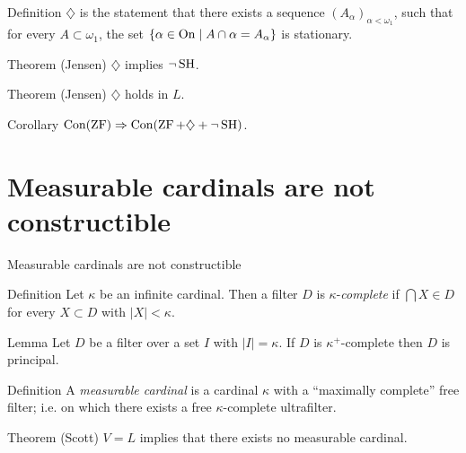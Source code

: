 \begin{frame}
	\begin{block}{Definition}
		$\diamondsuit$ is the statement that there exists a sequence $(A_\alpha)_{\alpha<\omega_1}$, such that for every $A\subset\omega_1$, the set $\{\alpha\in\operatorname{On}\mid A\cap\alpha=A_\alpha\}$ is stationary.
	\end{block}
	
	\pause\begin{block}{Theorem (Jensen)}
		$\diamondsuit$ implies $\lnot\operatorname{SH}$.
	\end{block}
	
	\pause\begin{block}{Theorem (Jensen)}
		$\diamondsuit$ holds in $L$.
	\end{block}
	
	\pause\begin{block}{Corollary}
		$\operatorname{Con}(\operatorname{ZF})\Rightarrow\operatorname{Con}(\operatorname{ZF}+\diamondsuit+\lnot\operatorname{SH})$.
	\end{block}
\end{frame}


\section[No measurables in $L$]{Measurable cardinals are not constructible}
\begin{frame}{Measurable cardinals are not constructible}
	\begin{block}{Definition}
		Let $\kappa$ be an infinite cardinal. Then a filter $D$ is $\kappa$-\textit{complete} if $\bigcap X\in D$ for every $X\subset D$ with $|X|<\kappa$.
	\end{block}
	
	\pause\begin{block}{Lemma}
		Let $D$ be a filter over a set $I$ with $|I|=\kappa$. If $D$ is $\kappa^+$-complete then $D$ is principal.
	\end{block}
	
	\pause\begin{block}{Definition}
		A \textit{measurable cardinal} is a cardinal $\kappa$ with a ``maximally complete'' free filter; i.e. on which there exists a free $\kappa$-complete ultrafilter.
	\end{block}
	
	\pause\begin{block}{Theorem (Scott)}
		$V{=}L$ implies that there exists no measurable cardinal.
	\end{block}
\end{frame}	

